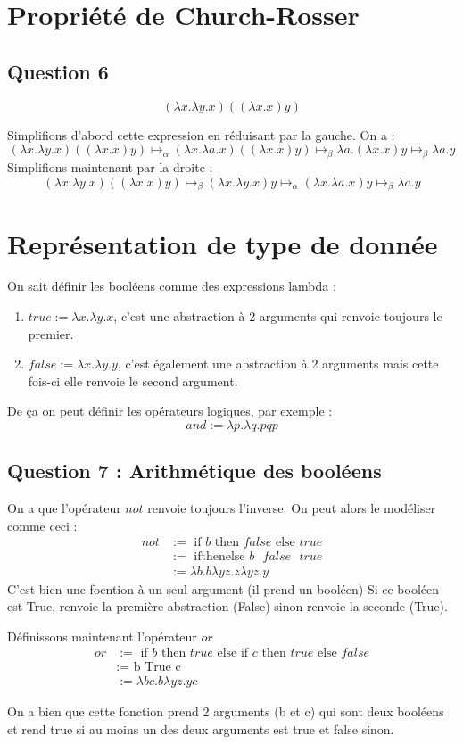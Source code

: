 \documentclass{article}
\begin{document}
\section{Propriété de Church-Rosser}

\subsection{Question 6}

$$(\lambda x.\lambda y.x)((\lambda x.x) y)$$

Simplifions d'abord cette expression en réduisant par la gauche. On a :
$$(\lambda x.\lambda y.x)((\lambda x.x) y) \mapsto_\alpha (\lambda x. \lambda a.x)((\lambda x.x) y) \mapsto_\beta \lambda a.(\lambda x.x)y \mapsto_\beta \lambda a.y $$
Simplifions maintenant par la droite : 
$$(\lambda x.\lambda y.x)((\lambda x.x) y) \mapsto_\beta (\lambda x.\lambda y.x)y \mapsto_\alpha (\lambda x.\lambda a.x)y \mapsto_\beta \lambda a.y$$

\section{Représentation de type de donnée}
On sait définir les booléens comme des expressions lambda : 
\begin{enumerate}
    \item $true := \lambda x.\lambda y.x$, c'est une abstraction à 2 arguments qui renvoie toujours le premier.
    \item $false := \lambda x.\lambda y.y$, c'est également une abstraction à 2 arguments mais cette fois-ci elle renvoie le second argument.
\end{enumerate}
De ça on peut définir les opérateurs logiques, par exemple :
$$ and := \lambda p.\lambda q.pqp $$
\subsection{Question 7 : Arithmétique des booléens}
On a que l'opérateur $not$ renvoie toujours l'inverse. On peut alors le modéliser comme ceci :
\begin{align*}
    not & := \text{ if } b \text{ then } false \text{ else } true \\
        &  := \text{ ifthenelse } b \text{ } false \text{ } true\\
        & := \lambda b.b \lambda yz.z \lambda yz.y
\end{align*}
C'est bien une focntion à un seul argument (il prend un booléen) Si ce booléen est True, renvoie la première abstraction (False) sinon renvoie la seconde (True).

Définissons maintenant l'opérateur $or$
\begin{align*}
    or & := \text{ if } b \text{ then } true \text{ else if } c \text{ then } true \text{ else } false \\
       & := \text{ b True c} \\
       & := \lambda bc.b \lambda yz.y c
\end{align*}

On a bien que cette fonction prend 2 arguments (b et c) qui sont deux booléens et rend true si au moins un des deux arguments est true et false sinon.
\end{document}
